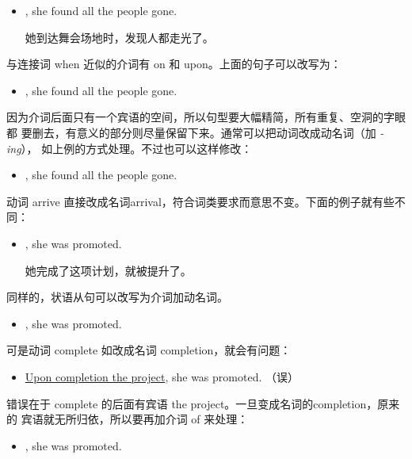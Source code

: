 \begin{itemize}
\item {}, she found all the people gone.

  她到达舞会场地时，发现人都走光了。
\end{itemize}
与连接词 when 近似的介词有 on 和 upon。上面的句子可以改写为：
\begin{itemize}
\item {}, she found all the people gone.
\end{itemize}

因为介词后面只有一个宾语的空间，所以句型要大幅精简，所有重复、空洞的字眼都
要删去，有意义的部分则尽量保留下来。通常可以把动词改成动名词（加 \emph{-ing}），
如上例的方式处理。不过也可以这样修改：
\begin{itemize}
\item {}, she found all the people gone.
\end{itemize}
动词 arrive 直接改成名词arrival，符合词类要求而意思不变。下面的例子就有些不
同：
\begin{itemize}
\item {}, she was promoted.

  她完成了这项计划，就被提升了。
\end{itemize}
同样的，状语从句可以改写为介词加动名词。
\begin{itemize}
\item {}, she was promoted.
\end{itemize}

可是动词 complete 如改成名词 completion，就会有问题：
\begin{itemize}
\item \ul{Upon completion the project}, she was promoted. （误）
\end{itemize}
错误在于 complete 的后面有宾语 the project。一旦变成名词的completion，原来的
宾语就无所归依，所以要再加介词 of 来处理：

\begin{itemize}
\item {}, she was promoted.
\end{itemize}

